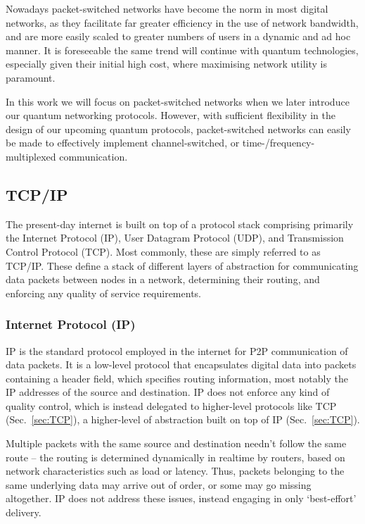 \documentclass[aps, rmp, twocolumn, amsmath, amssymb, nofootinbib, superscriptaddress, longbibliography, floatfix, table-of-contents, eqsecnum]{revtex4-1}
\begin{document}
Nowadays packet-switched networks have become the norm in most digital networks, as they facilitate far greater efficiency in the use of network bandwidth, and are more easily scaled to greater numbers of users in a dynamic and ad hoc manner. It is foreseeable the same trend will continue with quantum technologies, especially given their initial high cost, where maximising network utility is paramount.

In this work we will focus on packet-switched networks when we later introduce our quantum networking protocols. However, with sufficient flexibility in the design of our upcoming quantum protocols, packet-switched networks can easily be made to effectively implement channel-switched, or time-/frequency-multiplexed communication.

%
%

\subsection{TCP/IP} 

The present-day internet is built on top of a protocol stack comprising primarily the Internet Protocol (IP), User Datagram Protocol (UDP), and Transmission Control Protocol (TCP). Most commonly, these are simply referred to as TCP/IP. These define a stack of different layers of abstraction for communicating data packets between nodes in a network, determining their routing, and enforcing any quality of service requirements.

%
%

\subsubsection{Internet Protocol (IP)} 

IP is the standard protocol employed in the internet for P2P communication of data packets. It is a low-level protocol that encapsulates digital data into packets containing a header field, which specifies routing information, most notably the IP addresses of the source and destination. IP does not enforce any kind of quality control, which is instead delegated to higher-level protocols like TCP (Sec.~\ref{sec:TCP}), a higher-level of abstraction built on top of IP (Sec.~\ref{sec:TCP}).

Multiple packets with the same source and destination needn't follow the same route -- the routing is determined dynamically in realtime by routers, based on network characteristics such as load or latency. Thus, packets belonging to the same underlying data may arrive out of order, or some may go missing altogether. IP does not address these issues, instead engaging in only `best-effort' delivery. 
\end{document}
